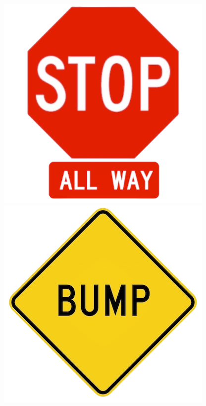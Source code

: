 \documentclass[journal]{IEEEtran}
\begin{document}
\begin{figure}[ht]
    \centering
    \begin{minipage}{0.1\textwidth}
        \centering
        \includegraphics[width=\linewidth]{images/All Way Stop.png}

    \end{minipage}\hfill
    \begin{minipage}{0.1\textwidth}
        \centering
        \includegraphics[width=\linewidth]{images/Bump.png}


\end{minipage}
\end{figure}
\end{document}
